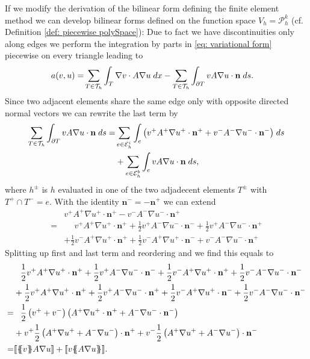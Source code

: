 If we modify the derivation of the bilinear form defining the finite element method we can develop bilinear forms defined on the function space $V_h = \mathcal P_h^k$ (cf. Definition \ref{def: piecewise polySpace}): Due to fact we have discontinuities only along edges we perform the integration by parts in \eqref{eq: variational form} piecewise on every triangle leading to
\begin{align}
	a(v, u) = & \sum_{T \in \mathcal{T}_h} \int_{T} {{\nabla v \cdot A \nabla u }\;dx}
		- \sum_{T \in \mathcal{T}_h} \int_{\partial T} {{ v A \nabla u \cdot \mathbf n}\;ds}.
\end{align}
Since two adjacent elements share the same edge only with opposite directed normal vectors we can rewrite the last term by
\begin{align*}
\sum\limits_{T \in \mathcal{T}_h}\int_{\partial T} {{ v A \nabla u \cdot \mathbf n }\;ds}
= &\sum\limits_{e \in \mathcal{E}_h^i}\int_{e} {{ \left( v^+ A^+ \nabla u^+ \cdot \mathbf n^+ + v^- A^- \nabla u^- \cdot \mathbf n^- \right)}\;ds} \\
& + \sum\limits_{e \in \mathcal{E}_h^b}\int_{e} {{ v A \nabla u \cdot \mathbf n}\;ds},
\end{align*}
where $h^\pm $ is $h$ evaluated in one of the two adjadecent elements $T^\pm$ with $T^+ \cap T^- = e$. With the identity $\mathbf n^- = -\mathbf n^+$ we can extend
\begin{align*}
	&v^+ A^+ \nabla u^+ \cdot \mathbf n^+ - v^- A^- \nabla u^- \cdot \mathbf n^+ \\
		= & \phantom{+} v^+ A^+ \nabla u^+ \cdot \mathbf n^+ 
		     + \frac 1 2  v^+ A^- \nabla u^- \cdot \mathbf n^- + \frac 1 2 v^+ A^- \nabla u^- \cdot \mathbf n^+ \\
		& + \frac 1 2  v^- A^+ \nabla u^+ \cdot \mathbf n^+ + \frac 1 2 v^- A^+ \nabla u^+ \cdot \mathbf n^-
		   + v^- A^- \nabla u^- \cdot \mathbf n^+
\end{align*}
Splitting up first and last term and reordering and we find this equals to
\begin{align*}
		 & \phantom{+} \frac 1 2 v^+ A^+ \nabla u^+ \cdot \mathbf n^+ 
		     + \frac 1 2  v^+ A^- \nabla u^- \cdot \mathbf n^- + \frac 1 2  v^- A^+ \nabla u^+ \cdot \mathbf n^+ + \frac 1 2 v^- A^- \nabla u^- \cdot \mathbf n^- \\
		& + \frac 1 2  v^+ A^+ \nabla u^+ \cdot \mathbf n^+  + \frac 1 2 v^+ A^- \nabla u^- \cdot \mathbf n^+ +\frac 1 2 v^- A^+ \nabla u^+ \cdot \mathbf n^- + \frac 1 2 v^- A^- \nabla u^- \cdot \mathbf n^-\\
		    	  = & \phantom{+} \frac 1 2 \left(v^+ + v^- \right) \left(A^+ \nabla u^+ \cdot \mathbf n^+ + A^- \nabla u^- \cdot \mathbf n^- \right) \\
  &+  v^+ \frac 1 2  \left(A^+ \nabla u^+ + A^- \nabla u^-\right) \cdot \mathbf n^+ + v^- \frac 1 2 \left(A^+ \nabla u^+ + A^- \nabla u^-\right) \cdot \mathbf n^- \\
  = &  \jump {\average v  A \nabla u}+ \jump {v \average{ A \nabla u}}.
\end{align*}
